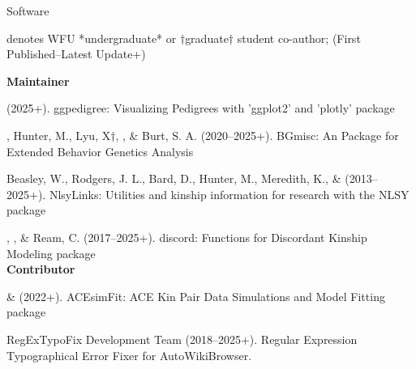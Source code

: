 \begin{rSection}{\textrm{Software}}%
\vspace{-1mm}\begin{center}\footnotesize{denotes WFU *undergraduate* or $\dagger$graduate$\dagger$ student co-author; (First Published–Latest Update+)}\end{center}\vspace{-4mm}
{\large \textbf {Maintainer}}%
\begin{etaremune}
\item \meb (2025+). ggpedigree: Visualizing Pedigrees with 'ggplot2' and 'plotly' \R package %
\item\meb, Hunter, M., Lyu, X$\dagger$, \jt, \& Burt, S. A. (2020–2025+). BGmisc: An \R Package  for Extended Behavior Genetics Analysis %

\item  Beasley, W., Rodgers, J. L., Bard, D., Hunter, M., Meredith, K., \& \meb  (2013–2025+). NlsyLinks: Utilities and kinship information for research with the NLSY \R package 

\item\meb, \jt, \& Ream, C. (2017–2025+). discord: Functions for Discordant Kinship Modeling \R package 
%
%
\smallskip\\
\hspace*{-8mm}\large{\bf{Contributor}}
\item \xyl  \& \meb (2022+). ACEsimFit: ACE Kin Pair Data Simulations and Model Fitting \R package 


\item RegExTypoFix Development Team (2018–2025+). Regular Expression Typographical Error Fixer for Auto\allowbreak WikiBrowser. 
%
%
%
\end{etaremune}
\end{rSection}
